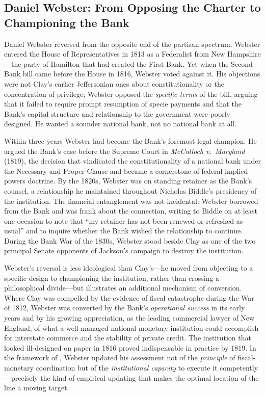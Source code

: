 \documentclass[12pt]{article}
\begin{document}
\subsection{Daniel Webster: From Opposing the Charter to Championing
             the Bank}

Daniel Webster reversed from the opposite end of the partisan spectrum.  Webster entered the House of
Representatives in 1813 as a Federalist from New Hampshire---the party
of Hamilton that had created the First Bank.  Yet when the Second Bank
bill came before the House in 1816, Webster voted against it.  His
objections were not Clay's earlier Jeffersonian ones about
constitutionality or the concentration of privilege; Webster opposed the
\emph{specific terms} of the bill, arguing that it failed to require
prompt resumption of specie payments and that the Bank's capital
structure and relationship to the government were poorly designed.  He
wanted a sounder national bank, not no national bank at all.

Within three years Webster had become the Bank's foremost legal
champion.  He argued the Bank's case before the Supreme Court in
\textit{McCulloch v.~Maryland} (1819), the decision that vindicated
the constitutionality of a national bank under the Necessary and Proper
Clause and became a cornerstone of federal implied-powers doctrine.
By the 1820s, Webster was on standing retainer as the Bank's counsel, a
relationship he maintained throughout Nicholas Biddle's presidency of
the institution.  The financial entanglement was not incidental: Webster
borrowed from the Bank and was frank about the connection, writing to
Biddle on at least one occasion to note that ``my retainer has not been
renewed or refreshed as usual'' and to inquire whether the Bank wished
the relationship to continue.  During the Bank War of the 1830s, Webster
stood beside Clay as one of the two principal Senate opponents of
Jackson's campaign to destroy the institution.

Webster's reversal is less ideological than Clay's---he moved from
objecting to a specific design to championing the institution, rather
than crossing a philosophical divide---but illustrates an additional mechanism of
conversion.  Where Clay was compelled by the evidence of fiscal
catastrophe during the War of 1812, Webster was converted by the Bank's
\emph{operational success} in its early years and by his growing
appreciation, as the leading commercial lawyer of New England, of what
a well-managed national monetary institution could accomplish for
interstate commerce and the stability of private credit.  The
institution that looked ill-designed on paper in 1816 proved
indispensable in practice by 1819.  In the framework of
\citet{Sargent2011}, Webster updated his assessment not of the
\emph{principle} of fiscal-monetary coordination but of the
\emph{institutional capacity} to execute it competently---precisely
the kind of empirical updating that makes the optimal location of the
line a moving target.
\end{document}
